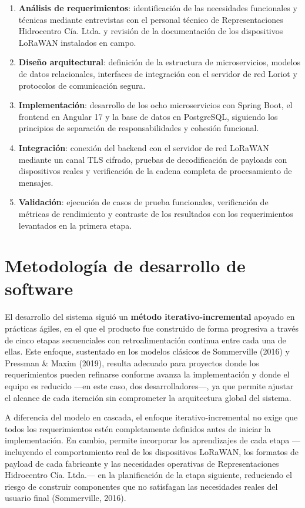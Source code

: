 \documentclass[12pt,a4paper,oneside]{report}
\begin{document}
\begin{enumerate}
  \item \textbf{Análisis de requerimientos}: identificación de las necesidades funcionales y técnicas mediante entrevistas con el personal técnico de Representaciones Hidrocentro Cía. Ltda. y revisión de la documentación de los dispositivos LoRaWAN instalados en campo.
  \item \textbf{Diseño arquitectural}: definición de la estructura de microservicios, modelos de datos relacionales, interfaces de integración con el servidor de red Loriot y protocolos de comunicación segura.
  \item \textbf{Implementación}: desarrollo de los ocho microservicios con Spring Boot, el frontend en Angular 17 y la base de datos en PostgreSQL, siguiendo los principios de separación de responsabilidades y cohesión funcional.
  \item \textbf{Integración}: conexión del backend con el servidor de red LoRaWAN mediante un canal TLS cifrado, pruebas de decodificación de payloads con dispositivos reales y verificación de la cadena completa de procesamiento de mensajes.
  \item \textbf{Validación}: ejecución de casos de prueba funcionales, verificación de métricas de rendimiento y contraste de los resultados con los requerimientos levantados en la primera etapa.
\end{enumerate}

\section{Metodología de desarrollo de software}\label{sec:metodologia-sw}

El desarrollo del sistema siguió un \textbf{método iterativo-incremental} apoyado en prácticas ágiles, en el que el producto fue construido de forma progresiva a través de cinco etapas secuenciales con retroalimentación continua entre cada una de ellas. Este enfoque, sustentado en los modelos clásicos de Sommerville (2016) y Pressman \& Maxim (2019), resulta adecuado para proyectos donde los requerimientos pueden refinarse conforme avanza la implementación y donde el equipo es reducido ---en este caso, dos desarrolladores---, ya que permite ajustar el alcance de cada iteración sin comprometer la arquitectura global del sistema.

A diferencia del modelo en cascada, el enfoque iterativo-incremental no exige que todos los requerimientos estén completamente definidos antes de iniciar la implementación. En cambio, permite incorporar los aprendizajes de cada etapa ---incluyendo el comportamiento real de los dispositivos LoRaWAN, los formatos de payload de cada fabricante y las necesidades operativas de Representaciones Hidrocentro Cía. Ltda.--- en la planificación de la etapa siguiente, reduciendo el riesgo de construir componentes que no satisfagan las necesidades reales del usuario final (Sommerville, 2016).
\end{document}
